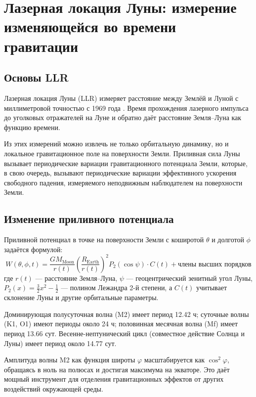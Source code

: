 \documentclass[12pt,a4paper]{article}
\theoremstyle{remark}
\begin{document}
	\section{Лазерная локация Луны: измерение изменяющейся во времени гравитации}
	\label{sec:llr}
	
	\subsection{Основы LLR}
	
	Лазерная локация Луны (LLR) измеряет расстояние между Землёй и Луной с миллиметровой точностью с 1969 года \cite{LLR-IfE}. Время прохождения лазерного импульса до уголковых отражателей на Луне и обратно даёт расстояние Земля–Луна как функцию времени.
	
	Из этих измерений можно извлечь не только орбитальную динамику, но и локальное гравитационное поле на поверхности Земли. Приливная сила Луны вызывает периодические вариации гравитационного потенциала Земли, которые, в свою очередь, вызывают периодические вариации эффективного ускорения свободного падения, измеряемого неподвижным наблюдателем на поверхности Земли.
	
	\subsection{Изменение приливного потенциала}
	
	Приливной потенциал в точке на поверхности Земли с коширотой \(\theta\) и долготой \(\phi\) задаётся формулой:
	\begin{equation}
		W(\theta,\phi,t) = \frac{GM_{\text{Moon}}}{r(t)} \left(\frac{R_{\text{Earth}}}{r(t)}\right)^2 P_2(\cos\psi) \cdot C(t) + \text{члены высших порядков}
		\label{eq:tidal-full}
	\end{equation}
	где \(r(t)\) — расстояние Земля–Луна, \(\psi\) — геоцентрический зенитный угол Луны, \(P_2(x)=\frac{3}{2}x^2-\frac12\) — полином Лежандра 2-й степени, а \(C(t)\) учитывает склонение Луны и другие орбитальные параметры.
	
	Доминирующая полусуточная волна (M2) имеет период 12.42 ч; суточные волны (K1, O1) имеют периоды около 24 ч; половинная месячная волна (Mf) имеет период 13.66 сут. Весенне-нептунический цикл (совместное действие Солнца и Луны) имеет период около 14.77 сут.
	
	Амплитуда волны M2 как функция широты \(\varphi\) масштабируется как \(\cos^2\varphi\), обращаясь в ноль на полюсах и достигая максимума на экваторе. Это даёт мощный инструмент для отделения гравитационных эффектов от других воздействий окружающей среды.
	
\end{document}
